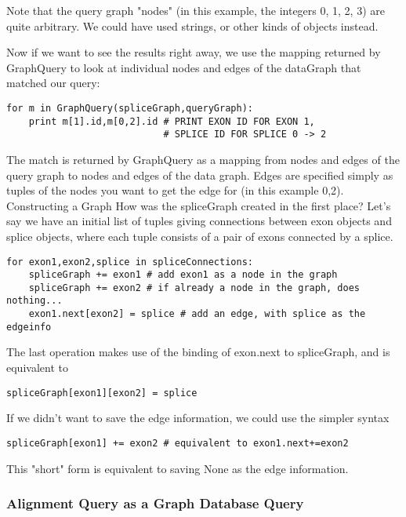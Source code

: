 \documentclass{howto}
\begin{document}
Note that the query graph "nodes" (in this example, the integers 0, 1, 2, 3) are
quite arbitrary.  We could have used strings, or other kinds of objects instead.

Now if we want to see the results right away, we use the mapping returned by GraphQuery to look at individual nodes and edges of the dataGraph that matched our query:

\begin{verbatim}
for m in GraphQuery(spliceGraph,queryGraph):
    print m[1].id,m[0,2].id # PRINT EXON ID FOR EXON 1,
                            # SPLICE ID FOR SPLICE 0 -> 2
\end{verbatim}

The match is returned by GraphQuery as a mapping from nodes and edges of the query graph to nodes and edges of the data graph.  Edges are specified simply as tuples of the nodes you want to get the edge for (in this example 0,2).
Constructing a Graph
How was the spliceGraph created in the first place?  Let's say we have an initial list of tuples giving connections between exon objects and splice objects, where each tuple consists of a pair of exons connected by a splice.

\begin{verbatim}
for exon1,exon2,splice in spliceConnections: 
    spliceGraph += exon1 # add exon1 as a node in the graph
    spliceGraph += exon2 # if already a node in the graph, does nothing...
    exon1.next[exon2] = splice # add an edge, with splice as the edgeinfo
\end{verbatim}

The last operation makes use of the binding of exon.next to spliceGraph, and is equivalent to

\begin{verbatim}
spliceGraph[exon1][exon2] = splice
\end{verbatim}

If we didn't want to save the edge information, we could use the simpler syntax

\begin{verbatim}
spliceGraph[exon1] += exon2 # equivalent to exon1.next+=exon2
\end{verbatim}

This "short" form is equivalent to saving None as the edge information.


\subsubsection{Alignment Query as a Graph Database Query}
\end{document}
